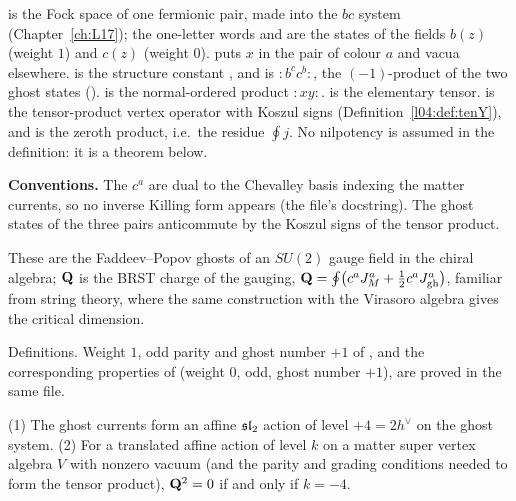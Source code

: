 \begin{dictionary}
 is the Fock space of one fermionic pair, made into the $bc$ system 
(Chapter~\ref{ch:L17}); the one-letter words  and  are the states of the fields
$b(z)$ (weight $1$) and $c(z)$ (weight $0$).  puts $x$ in the pair of colour $a$ and vacua elsewhere.  is the
structure constant , and  is ${:}b^cc^b{:}$, the $(-1)$-product of the two ghost states
().
 is the normal-ordered product ${:}xy{:}$.  is the elementary tensor.  is the
tensor-product vertex operator with Koszul signs (Definition~\ref{l04:def:tenY}), and  is the zeroth product,
i.e.\ the residue $\oint j$. No nilpotency is assumed in the definition: it is a theorem below.

\textbf{Conventions.} The $c^a$ are dual to the Chevalley basis indexing the matter currents, so no inverse Killing form appears
(the file's docstring). The ghost states of the three pairs anticommute by the Koszul signs of the tensor product.
\end{dictionary}

\begin{physics}
These are the Faddeev--Popov ghosts of an $SU(2)$ gauge field in the chiral algebra; $\mathbf Q$ is the BRST charge of the
gauging, $\mathbf Q=\oint\bigl(c^aJ^a_M+\tfrac12c^aJ^a_{\mathrm{gh}}\bigr)$, familiar from string theory, where the same
construction with the Virasoro algebra gives the critical dimension.
\end{physics}

\begin{status}
Definitions. Weight $1$, odd parity and ghost number $+1$ of , and the corresponding properties of
 (weight $0$, odd, ghost number $+1$), are proved in the same file.
\end{status}

\begin{theorem}\label{l28:thm:qsq}
(1) The ghost currents form an affine $\mathfrak{sl}_2$ action of level $+4=2h^\vee$ on the ghost system.
(2) For a translated affine action of level $k$ on a matter super vertex algebra $V$ with nonzero vacuum (and the parity and grading
conditions needed to form the tensor product), $\mathbf Q^2=0$ if and only if $k=-4$.
\end{theorem}

